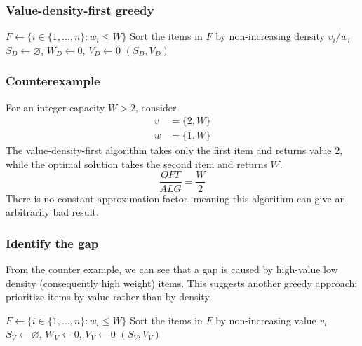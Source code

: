 \documentclass[10pt]{article}
\theoremstyle{definition}
\begin{document}
\subsubsection*{Value-density-first greedy}

\begin{algorithm}[H]
  \caption{Value-density-first greedy for 0/1 knapsack}
  $F \gets \{i \in \{1,\ldots,n\}:w_i\leq W\}$\;
  Sort the items in $F$ by non-increasing density $v_i/w_i$\;
  $S_D \gets \varnothing$, $W_D \gets 0$, $V_D \gets 0$\;
  \Return $(S_D,V_D)$\;
\end{algorithm}

\subsubsection*{Counterexample}
For an integer capacity $W>2$, consider
\begin{align*}
  v &= \{2, W\}\\
  w &= \{1, W\}
\end{align*}
The value-density-first algorithm takes only the first item and returns value $2$, while the optimal solution takes the second item and returns $W$. 
\[\frac{OPT}{ALG} = \frac{W}{2}\]
There is no constant approximation factor, meaning this algorithm can give an arbitrarily bad result. 
\subsubsection*{Identify the gap}
From the counter example, we can see that a gap is caused by high-value low density (consequently high weight) items. 
This suggests another greedy approach: prioritize items by value rather than by density.


\begin{algorithm}[H]
  \caption{Value-first greedy for 0/1 knapsack}
  $F \gets \{i \in \{1,\ldots,n\}:w_i\leq W\}$\;
  Sort the items in $F$ by non-increasing value $v_i$\;
  $S_V \gets \varnothing$, $W_V \gets 0$, $V_V \gets 0$\;
  \Return $(S_V,V_V)$\;
\end{algorithm}
\end{document}
